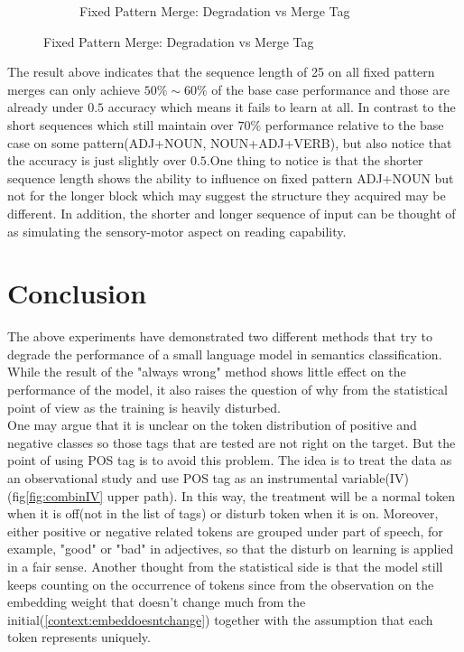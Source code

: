 \documentclass[12pt]{article}
\begin{document}
\begin{figure} [!h]
\begin{center}
\begin{subfigure}[h]{0.4\linewidth}
\caption{Fixed Pattern Merge: Degradation vs Merge Tag}
\label{fig:fixmergeScatter2}
\end{subfigure}
\end{center}
\end{figure}

The result above indicates that the sequence length of 25 on all fixed pattern merges can only achieve $50\%\sim60\%$ of the base case performance and those are already under $0.5$ accuracy which means it fails to learn at all. In contrast to the short sequences which still maintain over $70\%$ performance relative to the base case on some pattern(ADJ+NOUN, NOUN+ADJ+VERB), but also notice that the accuracy is just slightly over $0.5$.One thing to notice is that the shorter sequence length shows the ability to influence on fixed pattern ADJ+NOUN but not for the longer block which may suggest the structure they acquired may be different. In addition, the shorter and longer sequence of input can be thought of as simulating the sensory-motor aspect\cite{Hauser_2002} on reading capability. 

\section{Conclusion}

The above experiments have demonstrated two different methods that try to degrade the performance of a small language model in semantics classification. While the result of the "always wrong" method shows little effect on the performance of the model, it also raises the question of why from the statistical point of view as the training is heavily disturbed. \\

One may argue that it is unclear on the token distribution of positive and negative classes so those tags that are tested are not right on the target. But the point of using POS tag is to avoid this problem. The idea is to treat the data as an observational study and use POS tag as an instrumental variable(IV) (fig\ref{fig:combinIV} upper path). In this way, the treatment will be a normal token when it is off(not in the list of tags) or disturb token when it is on. Moreover, either positive or negative related tokens are grouped under part of speech, for example, "good" or "bad" in adjectives, so that the disturb on learning is applied in a fair sense. \label{text:alwayswrongArg}Another thought from the statistical side is that the model still keeps counting on the occurrence of tokens since from the observation on the embedding weight that doesn't change much from the initial(\ref{context:embeddoesntchange}) together with the assumption that each token represents uniquely.
\end{document}
